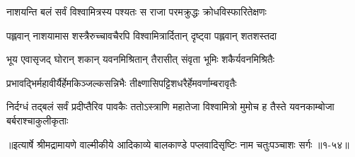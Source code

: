 \twolineshloka
{नाशयन्ति बलं सर्वं विश्वामित्रस्य पश्यतः}
{स राजा परमक्रुद्धः क्रोधविस्फारितेक्षणः} %

\twolineshloka
{पह्लवान् नाशयामास शस्त्रैरुच्चावचैरपि}
{विश्वामित्रार्दितान् दृष्ट्वा पह्लवान् शतशस्तदा} %

\twolineshloka
{भूय एवासृजद् घोरान् शकान् यवनमिश्रितान्}
{तैरासीत् संवृता भूमिः शकैर्यवनमिश्रितैः} %

\twolineshloka
{प्रभावद्भिर्महावीर्यैर्हेमकिञ्जल्कसन्निभैः}
{तीक्ष्णासिपट्टिशधरैर्हेमवर्णाम्बरावृतैः} %

\threelineshloka
{निर्दग्धं तद्बलं सर्वं प्रदीप्तैरिव पावकैः}
{ततोऽस्त्राणि महातेजा विश्वामित्रो मुमोच ह}
{तैस्ते यवनकाम्बोजा बर्बराश्चाकुलीकृताः} %


॥इत्यार्षे श्रीमद्रामायणे वाल्मीकीये आदिकाव्ये बालकाण्डे पप्लवादिसृष्टिः नाम चतुःपञ्चाशः सर्गः ॥१-५४॥
